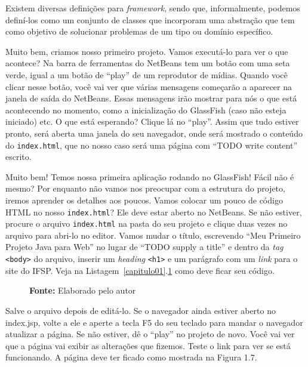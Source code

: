 \begin{saibaMais}
    Existem diversas definições para \textit{framework}, sendo que, informalmente, podemos definí-los como um conjunto de classes que incorporam uma abstração que tem como objetivo de solucionar problemas de um tipo ou domínio específico.
\end{saibaMais}

Muito bem, criamos nosso primeiro projeto. Vamos executá-lo para ver o que acontece? Na barra de ferramentas do NetBeans tem um botão com uma seta verde, igual a um botão de ``play'' de um reprodutor de mídias. Quando você clicar nesse botão, você vai ver que várias mensagens começarão a aparecer na janela de saída do NetBeans. Essas mensagens irão mostrar para nós o que está acontecendo no momento, como a inicialização do GlassFish (caso não esteja iniciado) etc. O que está esperando? Clique lá no ``play''. Assim que tudo estiver pronto, será aberta uma janela do seu navegador, onde será mostrado o conteúdo do \texttt{index.html}, que no nosso caso será uma página com ``TODO write content'' escrito.

Muito bem! Temos nossa primeira aplicação rodando no GlassFish! Fácil não é mesmo? Por enquanto não vamos nos preocupar com a estrutura do projeto, iremos aprender os detalhes aos poucos. Vamos colocar um pouco de código HTML no nosso \texttt{index.html}? Ele deve estar aberto no NetBeans. Se não estiver, procure o arquivo \texttt{index.html} na pasta  do seu projeto e clique duas vezes no arquivo para abri-lo no editor. Vamos mudar o título, escrevendo ``Meu Primeiro Projeto Java para Web'' no lugar de ``TODO supply a title'' e dentro da \textit{tag} \texttt{<body>} do arquivo, inserir um \textit{heading} \texttt{<h1>} e um parágrafo com um \textit{link} para o site do IFSP. Veja na Listagem~\ref{capitulo01}.\ref{cod:OlaMundoWeb-index.html} como deve ficar seu código.

\FloatBarrier
\begin{figure}
    \centering
    \textbf{Fonte:} Elaborado pelo autor
    \label{cod:OlaMundoWeb-index.html}
\end{figure}
\FloatBarrier

Salve o arquivo depois de editá-lo. Se o navegador ainda estiver aberto no index.jsp, volte a ele e aperte a tecla F5 do seu teclado para mandar o navegador atualizar a página. Se não estiver, dê o ``play'' no projeto de novo. Você vai ver que a página vai exibir as alterações que fizemos. Teste o link para ver se está funcionando. A página deve ter ficado como mostrada na Figura 1.7.

